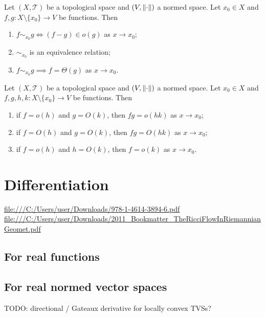 \begin{lemma}
Let $(X,\mathcal{T})$ be a topological space and $(V,\lVert\cdot\rVert)$ a normed space. Let $x_0 \in X$ and $f,g: X\setminus\{x_0\}\to V$ be functions. Then
\begin{enumerate}
\item $f\sim_{x_0} g \iff (f-g)\in o(g)$ as $x\to x_0$;
\item $\sim_{x_0}$ is an equivalence relation;
\item $f \sim_{x_0} g \implies f = \Theta(g)$ as $x\to x_0$.
\end{enumerate}
\end{lemma}

\begin{lemma}
Let $(X,\mathcal{T})$ be a topological space and $(V,\lVert\cdot\rVert)$ a normed space. Let $x_0 \in X$ and $f,g, h,k: X\setminus\{x_0\}\to V$ be functions. Then
\begin{enumerate}
\item if $f = o(h)$ and $g = O(k)$, then $fg = o(hk)$ as $x\to x_0$;
\item if $f = O(h)$ and $g = O(k)$, then $fg = O(hk)$ as $x\to x_0$;
\item if $f = o(h)$ and $h = O(k)$, then $f = o(k)$ as $x\to x_0$.
\end{enumerate}
\end{lemma}

\chapter{Differentiation}
\url{file:///C:/Users/user/Downloads/978-1-4614-3894-6.pdf}
\url{file:///C:/Users/user/Downloads/2011_Bookmatter_TheRicciFlowInRiemannianGeomet.pdf}

\section{For real functions}

\section{For real normed vector spaces}
TODO: directional / Gateaux derivative for locally convex TVSs?
